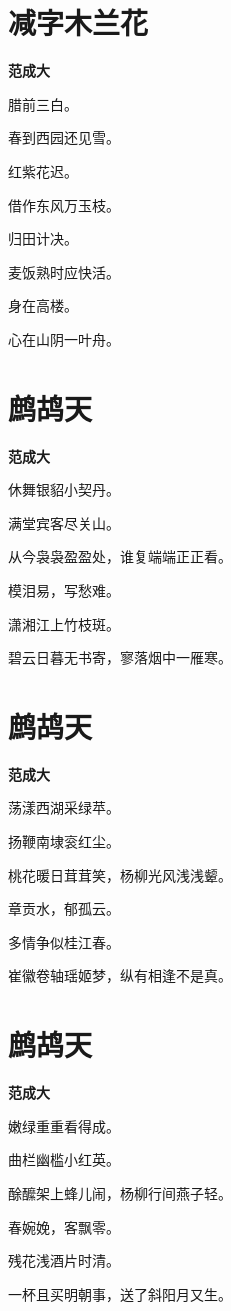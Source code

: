 \documentclass[12pt,a4paper]{ctexbook}
\begin{document}
\section{减字木兰花}
\textbf{范成大}\par\vspace{0.5em}
腊前三白。\par
春到西园还见雪。\par
红紫花迟。\par
借作东风万玉枝。\par
归田计决。\par
麦饭熟时应快活。\par
身在高楼。\par
心在山阴一叶舟。\par

\section{鹧鸪天}
\textbf{范成大}\par\vspace{0.5em}
休舞银貂小契丹。\par
满堂宾客尽关山。\par
从今袅袅盈盈处，谁复端端正正看。\par
模泪易，写愁难。\par
潇湘江上竹枝斑。\par
碧云日暮无书寄，寥落烟中一雁寒。\par

\section{鹧鸪天}
\textbf{范成大}\par\vspace{0.5em}
荡漾西湖采绿苹。\par
扬鞭南埭衮红尘。\par
桃花暖日茸茸笑，杨柳光风浅浅颦。\par
章贡水，郁孤云。\par
多情争似桂江春。\par
崔徽卷轴瑶姬梦，纵有相逢不是真。\par

\section{鹧鸪天}
\textbf{范成大}\par\vspace{0.5em}
嫩绿重重看得成。\par
曲栏幽槛小红英。\par
酴醿架上蜂儿闹，杨柳行间燕子轻。\par
春婉娩，客飘零。\par
残花浅酒片时清。\par
一杯且买明朝事，送了斜阳月又生。\par
\end{document}

